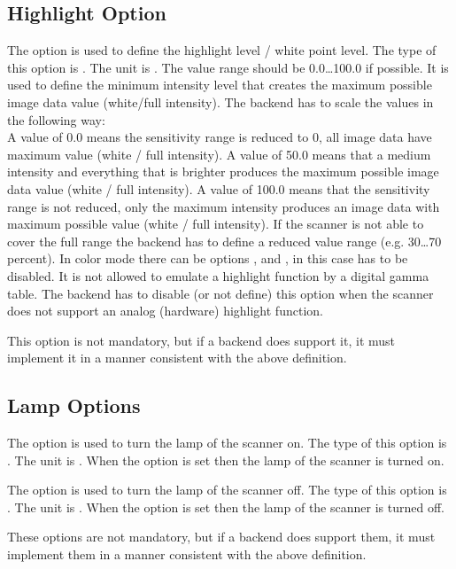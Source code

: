 \documentclass[11pt,DVIps]{report}
\begin{document}
\begin{changebar}
\subsection{Highlight Option}
The option  is used to define the highlight level / white point level.
The type of this option is .
The unit is . The value range
should be 0.0\ldots100.0 if possible.
It is used to define the minimum intensity level that creates the maximum possible
image data value (white/full intensity).  The backend has to scale the values in the
following way:\\
A value of 0.0 means the sensitivity range is reduced to 0, all image
data have maximum value (white / full intensity).
A value of 50.0 means that a medium intensity and everything that is brighter
produces the maximum possible image data value (white / full intensity).
A value of 100.0 means that the sensitivity range is not reduced, only the
maximum intensity produces an image data with maximum possible value (white / full intensity).
If  the scanner is not able to cover the full range the backend has to define a reduced
value range (e.g. 30\ldots70 percent).
In color mode there can be options , 
and , in this case  has to be disabled.
It is not allowed to emulate a highlight function by
a digital gamma table. The backend has to disable (or not
define) this option when the scanner does not support an
analog (hardware) highlight function.

This option is not mandatory, but if a backend does support it, it
must implement it in a manner consistent with the above definition.\\
\end{changebar}


\begin{changebar}
\subsection{Lamp Options}
The option  is used to turn the lamp of the scanner on.
The type of this option is .
The unit is . When the option is set
then the lamp of the scanner is turned on.

The option  is used to turn the lamp of the scanner off.
The type of this option is .
The unit is . When the option is set
then the lamp of the scanner is turned off.

These options are not mandatory, but if a backend does support them, it
must implement them in a manner consistent with the above definition.\\
\end{changebar}
\end{document}

